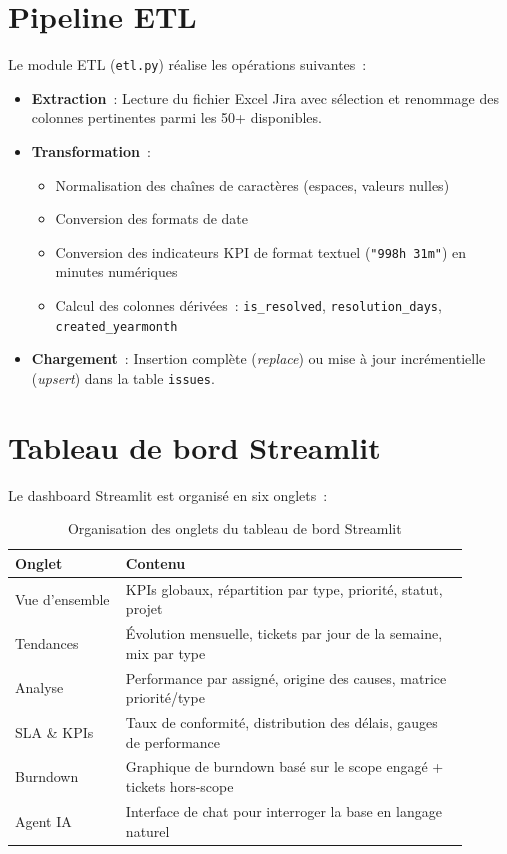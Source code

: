 \documentclass[12pt, a4paper]{report}
\begin{document}
\section{Pipeline ETL}

Le module ETL (\texttt{etl.py}) réalise les opérations suivantes~:

\begin{itemize}[leftmargin=2em]
    \item \textbf{Extraction}~: Lecture du fichier Excel Jira avec sélection et renommage des colonnes pertinentes parmi les 50+ disponibles.
    \item \textbf{Transformation}~:
    \begin{itemize}
        \item Normalisation des chaînes de caractères (espaces, valeurs nulles)
        \item Conversion des formats de date
        \item Conversion des indicateurs KPI de format textuel (\texttt{"998h 31m"}) en minutes numériques
        \item Calcul des colonnes dérivées~: \texttt{is\_resolved}, \texttt{resolution\_days}, \texttt{created\_yearmonth}
    \end{itemize}
    \item \textbf{Chargement}~: Insertion complète (\textit{replace}) ou mise à jour incrémentielle (\textit{upsert}) dans la table \texttt{issues}.
\end{itemize}

\section{Tableau de bord Streamlit}

Le dashboard Streamlit est organisé en six onglets~:

\begin{table}[h!]
\centering
\begin{tabular}{p{0.22\linewidth} p{0.68\linewidth}}
    \toprule
    \textbf{Onglet} & \textbf{Contenu} \\
    \midrule
    Vue d'ensemble & KPIs globaux, répartition par type, priorité, statut, projet \\
    Tendances & Évolution mensuelle, tickets par jour de la semaine, mix par type \\
    Analyse & Performance par assigné, origine des causes, matrice priorité/type \\
    SLA \& KPIs & Taux de conformité, distribution des délais, gauges de performance \\
    Burndown & Graphique de burndown basé sur le scope engagé + tickets hors-scope \\
    Agent IA & Interface de chat pour interroger la base en langage naturel \\
    \bottomrule
\end{tabular}
\caption{Organisation des onglets du tableau de bord Streamlit}
\end{table}
\end{document}
